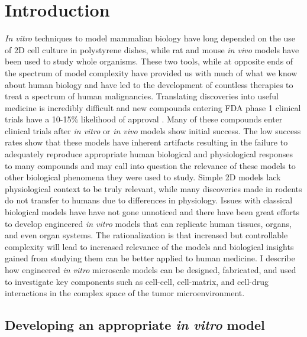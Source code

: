 \chapter{Introduction}
\label{Chap:Introduction}

\textit{In vitro} techniques to model mammalian biology have long depended on the use of 2D cell culture in polystyrene dishes, while rat and mouse \textit{in vivo} models have been used to study whole organisms. These two tools, while at opposite ends of the spectrum of model complexity have provided us with much of what we know about human biology and have led to the development of countless therapies to treat a spectrum of human malignancies. Translating discoveries into useful medicine is incredibly difficult and new compounds entering FDA phase 1 clinical trials have a 10-15\% likelihood of approval \cite{Hay2014}. Many of these compounds enter clinical trials after \textit{in vitro} or \textit{in vivo} models show initial success. The low success rates show that these models have inherent artifacts resulting in the failure to adequately reproduce appropriate human biological and physiological responses to many compounds and may call into question the relevance of these models to other biological phenomena they were used to study. Simple 2D models lack physiological context to be truly relevant, while many discoveries made in rodents do not transfer to humans due to differences in physiology. Issues with classical biological models have have not gone unnoticed and there have been great efforts to develop engineered \textit{in vitro} models that can replicate human tissues, organs, and even organ systems. The rationalization is that increased but controllable complexity will lead to increased relevance of the models and biological insights gained from studying them can be better applied to human medicine. I describe how engineered \textit{in vitro} microscale models can be designed, fabricated, and used to investigate key components such as cell-cell, cell-matrix, and cell-drug interactions in the complex space of the tumor microenvironment.

\section{Developing an appropriate \textit{in vitro} model}

